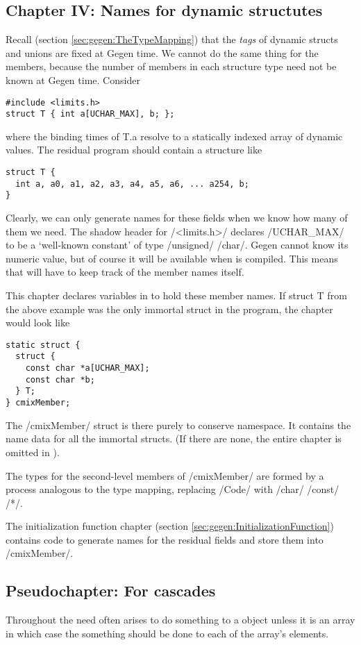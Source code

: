 \begin{docpart}
\subsection{Chapter IV: Names for dynamic structutes}
\label{sec:gegen:NamesForDynamicStructures}
Recall (section \ref{sec:gegen:TheTypeMapping}) that the \emph{tags}
of dynamic structs and unions are fixed at Gegen time. We cannot do
the same thing for the members, because the number of members in each
structure type need not be known at Gegen time. Consider
\begin{verbatim}
#include <limits.h>
struct T { int a[UCHAR_MAX], b; };
\end{verbatim}
where the binding times of T.a resolve to a statically indexed array
of dynamic values. The residual program should contain a structure
like
\begin{verbatim}
struct T {
  int a, a0, a1, a2, a3, a4, a5, a6, ... a254, b;
}
\end{verbatim}

Clearly, we can only generate names for these fields when we know
how many of them we need. The shadow header for /<limits.h>/ declares
/UCHAR_MAX/ to be a `well-known constant' of type /unsigned/
/char/. Gegen cannot know its numeric value, but of course it will
be available when \Pgen{} is compiled. This means that \Pgen{} will
have to keep track of the member names itself.

This chapter declares variables in \Pgen{} to hold these member names.
If struct T from the above example was the only immortal struct in the
program, the chapter would look like
\begin{verbatim}
static struct {
  struct {
    const char *a[UCHAR_MAX];
    const char *b;
  } T;
} cmixMember;
\end{verbatim}

The /cmixMember/ struct is there purely to conserve namespace. It
contains the name data for all the immortal structs. (If there are
none, the entire chapter is omitted in \Pgen).

The types for the second-level members of /cmixMember/ are formed
by a process analogous to the \Pgen{} type mapping, replacing /Code/
with /char/ /const/ /*/.

The initialization function chapter (section
\ref{sec:gegen:InitializationFunction}) contains code to generate
names for the residual fields and store them into /cmixMember/.

\subsection{Pseudochapter: For cascades}
\label{sec:gegen:ForCascades}
Throughout \Pgen{} the need often arises to do something to a \Pgen{}
object unless it is an array in which case the something should be
done to each of the array's elements.


\end{docpart}
